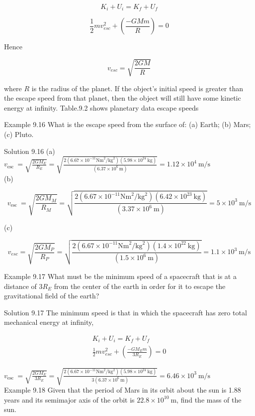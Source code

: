 \documentclass[10pt]{article}
\begin{document}
$$
K_{i}+U_{i}=K_{f}+U_{f}
$$

$$
\frac{1}{2} m v_{e s c}^{2}+\left(\frac{-G M m}{R}\right)=0
$$

Hence

$$
v_{e s c}=\sqrt{\frac{2 G M}{R}}
$$

where $R$ is the radius of the planet. If the object's initial speed is greater than the escape speed from that planet, then the object will still have some kinetic energy at infinity. Table.9.2 shows planetary data escape speeds

Example 9.16 What is the escape speed from the surface of: (a) Earth; (b) Mars; (c) Pluto.

Solution 9.16 (a)\\
$v_{\text {esc }}=\sqrt{\frac{2 G M_{E}}{R_{E}}}=\sqrt{\frac{2\left(6.67 \times 10^{-11} \mathrm{Nm}^{2} / \mathrm{kg}^{2}\right)\left(5.98 \times 10^{24} \mathrm{~kg}\right)}{\left(6.37 \times 10^{6} \mathrm{~m}\right)}}=1.12 \times 10^{4} \mathrm{~m} / \mathrm{s}$\\
(b)

$$
v_{\text {esc }}=\sqrt{\frac{2 G M_{M}}{R_{M}}}=\sqrt{\frac{2\left(6.67 \times 10^{-11} \mathrm{Nm}^{2} / \mathrm{kg}^{2}\right)\left(6.42 \times 10^{23} \mathrm{~kg}\right)}{\left(3.37 \times 10^{6} \mathrm{~m}\right)}}=5 \times 10^{3} \mathrm{~m} / \mathrm{s}
$$

(c)

$$
v_{e s c}=\sqrt{\frac{2 G M_{P}}{R_{P}}}=\sqrt{\frac{2\left(6.67 \times 10^{-11} \mathrm{Nm}^{2} / \mathrm{kg}^{2}\right)\left(1.4 \times 10^{22} \mathrm{~kg}\right)}{\left(1.5 \times 10^{6} \mathrm{~m}\right)}}=1.1 \times 10^{3} \mathrm{~m} / \mathrm{s}
$$

Example 9.17 What must be the minimum speed of a spacecraft that is at a distance of $3 R_{E}$ from the center of the earth in order for it to escape the gravitational field of the earth?

Solution 9.17 The minimum speed is that in which the spacecraft has zero total mechanical energy at infinity,

$$
\begin{gathered}
K_{i}+U_{i}=K_{f}+U_{f} \\
\frac{1}{2} m v_{e s c}^{2}+\left(\frac{-G M_{E} m}{3 R_{E}}\right)=0
\end{gathered}
$$

$v_{\text {esc }}=\sqrt{\frac{2 G M_{E}}{3 R_{E}}}=\sqrt{\frac{2\left(6.67 \times 10^{-11} \mathrm{Nm}^{2} / \mathrm{kg}^{2}\right)\left(5.98 \times 10^{24} \mathrm{~kg}\right)}{3\left(6.37 \times 10^{6} \mathrm{~m}\right)}}=6.46 \times 10^{3} \mathrm{~m} / \mathrm{s}$\\
Example 9.18 Given that the period of Mars in its orbit about the sun is 1.88 years and its semimajor axis of the orbit is $22.8 \times 10^{10} \mathrm{~m}$, find the mass of the sun.
\end{document}
